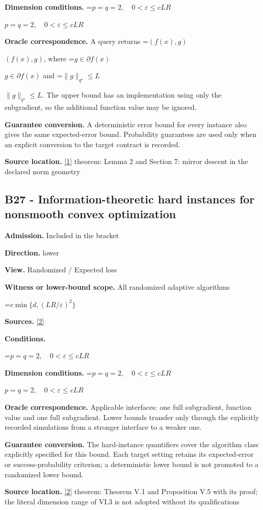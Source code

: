 \documentclass[10pt,a4paper]{article}
\newcommand{\AtlasMath}[1]{\par\begingroup\centering\setbox0=\hbox{$\displaystyle #1$}\ifdim\wd0>1.4\linewidth\typeout{ATLAS WIDE FORMULA: \the\wd0}\fi\ifdim\wd0>\linewidth\resizebox{\linewidth}{!}{\box0}\else\box0\fi\par\endgroup}
\newcommand{\AtlasInlineMath}[1]{\begingroup\setbox0=\hbox{$#1$}\ifdim\wd0>.4\linewidth\endgroup\AtlasMath{#1}\else\endgroup$#1$\fi}
\begin{document}
\textbf{Dimension conditions.} \AtlasInlineMath{p=q=2,\quad0<\varepsilon\le cLR}

\textbf{Oracle correspondence.} A query returns \AtlasInlineMath{(f(x),g)}, where \AtlasInlineMath{g\in\partial f(x)} and \AtlasInlineMath{\|g\|_{q^\star}\le L}. The upper bound has an implementation using only the subgradient, so the additional function value may be ignored.

\textbf{Guarantee conversion.} A deterministic error bound for every instance also gives the same expected-error bound. Probability guarantees are used only when an explicit conversion to the target contract is recorded.

\textbf{Source location.} \href{https://arxiv.org/pdf/1107.4080}{[1]} theorem: Lemma 2 and Section 7: mirror descent in the declared norm geometry

\subsection{B27 - Information-theoretic hard instances for nonsmooth convex optimization}
\textbf{Admission.} Included in the bracket

\textbf{Direction.} lower

\textbf{View.} Randomized / Expected loss

\textbf{Witness or lower-bound scope.} All randomized adaptive algorithms

\AtlasMath{c\min\{d,(LR/\varepsilon)^2\}}
\textbf{Sources.} \href{https://arxiv.org/pdf/1407.5144}{[2]}

\textbf{Conditions.} 
\AtlasMath{p=q=2,\quad0<\varepsilon\le cLR}


\textbf{Dimension conditions.} \AtlasInlineMath{p=q=2,\quad0<\varepsilon\le cLR}

\textbf{Oracle correspondence.} Applicable interfaces: one full subgradient, function value and one full subgradient. Lower bounds transfer only through the explicitly recorded simulations from a stronger interface to a weaker one.

\textbf{Guarantee conversion.} The hard-instance quantifiers cover the algorithm class explicitly specified for this bound. Each target setting retains its expected-error or success-probability criterion; a deterministic lower bound is not promoted to a randomized lower bound.

\textbf{Source location.} \href{https://arxiv.org/pdf/1407.5144}{[2]} theorem: Theorem V.1 and Proposition V.5 with its proof; the literal dimension range of VI.3 is not adopted without its qualifications
\end{document}
